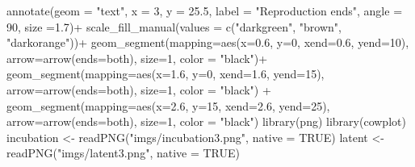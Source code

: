 \documentclass[
  letterpaper,
]{book}
\newenvironment{Shaded}{\begin{snugshade}}{\end{snugshade}}
\newcommand{\AttributeTok}[1]{\textcolor[rgb]{0.40,0.45,0.13}{#1}}
\newcommand{\ConstantTok}[1]{\textcolor[rgb]{0.56,0.35,0.01}{#1}}
\newcommand{\DecValTok}[1]{\textcolor[rgb]{0.68,0.00,0.00}{#1}}
\newcommand{\FloatTok}[1]{\textcolor[rgb]{0.68,0.00,0.00}{#1}}
\newcommand{\FunctionTok}[1]{\textcolor[rgb]{0.28,0.35,0.67}{#1}}
\newcommand{\NormalTok}[1]{\textcolor[rgb]{0.00,0.23,0.31}{#1}}
\newcommand{\OtherTok}[1]{\textcolor[rgb]{0.00,0.23,0.31}{#1}}
\newcommand{\SpecialCharTok}[1]{\textcolor[rgb]{0.37,0.37,0.37}{#1}}
\newcommand{\StringTok}[1]{\textcolor[rgb]{0.13,0.47,0.30}{#1}}
\begin{document}
\begin{Shaded}
\begin{Highlighting}[]
  \FunctionTok{annotate}\NormalTok{(}\AttributeTok{geom =} \StringTok{"text"}\NormalTok{, }\AttributeTok{x =} \DecValTok{3}\NormalTok{, }\AttributeTok{y =} \FloatTok{25.5}\NormalTok{, }\AttributeTok{label =} \StringTok{"Reproduction ends"}\NormalTok{, }\AttributeTok{angle =} \DecValTok{90}\NormalTok{, }\AttributeTok{size =}\FloatTok{1.7}\NormalTok{)}\SpecialCharTok{+}
  \FunctionTok{scale\_fill\_manual}\NormalTok{(}\AttributeTok{values =} \FunctionTok{c}\NormalTok{(}\StringTok{"darkgreen"}\NormalTok{,  }\StringTok{"brown"}\NormalTok{, }\StringTok{"darkorange"}\NormalTok{))}\SpecialCharTok{+}
  \FunctionTok{geom\_segment}\NormalTok{(}\AttributeTok{mapping=}\FunctionTok{aes}\NormalTok{(}\AttributeTok{x=}\FloatTok{0.6}\NormalTok{, }\AttributeTok{y=}\DecValTok{0}\NormalTok{, }\AttributeTok{xend=}\FloatTok{0.6}\NormalTok{, }\AttributeTok{yend=}\DecValTok{10}\NormalTok{), }\AttributeTok{arrow=}\FunctionTok{arrow}\NormalTok{(}\AttributeTok{ends=}\StringTok{\textquotesingle{}both\textquotesingle{}}\NormalTok{), }\AttributeTok{size=}\DecValTok{1}\NormalTok{, }\AttributeTok{color =} \StringTok{"black"}\NormalTok{)}\SpecialCharTok{+} 
  \FunctionTok{geom\_segment}\NormalTok{(}\AttributeTok{mapping=}\FunctionTok{aes}\NormalTok{(}\AttributeTok{x=}\FloatTok{1.6}\NormalTok{, }\AttributeTok{y=}\DecValTok{0}\NormalTok{, }\AttributeTok{xend=}\FloatTok{1.6}\NormalTok{, }\AttributeTok{yend=}\DecValTok{15}\NormalTok{), }\AttributeTok{arrow=}\FunctionTok{arrow}\NormalTok{(}\AttributeTok{ends=}\StringTok{\textquotesingle{}both\textquotesingle{}}\NormalTok{), }\AttributeTok{size=}\DecValTok{1}\NormalTok{, }\AttributeTok{color =} \StringTok{"black"}\NormalTok{)  }\SpecialCharTok{+}
   \FunctionTok{geom\_segment}\NormalTok{(}\AttributeTok{mapping=}\FunctionTok{aes}\NormalTok{(}\AttributeTok{x=}\FloatTok{2.6}\NormalTok{, }\AttributeTok{y=}\DecValTok{15}\NormalTok{, }\AttributeTok{xend=}\FloatTok{2.6}\NormalTok{, }\AttributeTok{yend=}\DecValTok{25}\NormalTok{), }\AttributeTok{arrow=}\FunctionTok{arrow}\NormalTok{(}\AttributeTok{ends=}\StringTok{\textquotesingle{}both\textquotesingle{}}\NormalTok{), }\AttributeTok{size=}\DecValTok{1}\NormalTok{, }\AttributeTok{color =} \StringTok{"black"}\NormalTok{) }
  \FunctionTok{library}\NormalTok{(png)}
  \FunctionTok{library}\NormalTok{(cowplot)}
\NormalTok{  incubation }\OtherTok{\textless{}{-}} \FunctionTok{readPNG}\NormalTok{(}\StringTok{"imgs/incubation3.png"}\NormalTok{, }\AttributeTok{native =} \ConstantTok{TRUE}\NormalTok{)}
\NormalTok{  latent }\OtherTok{\textless{}{-}} \FunctionTok{readPNG}\NormalTok{(}\StringTok{"imgs/latent3.png"}\NormalTok{, }\AttributeTok{native =} \ConstantTok{TRUE}\NormalTok{)}

\end{Highlighting}
\end{Shaded}
\end{document}
